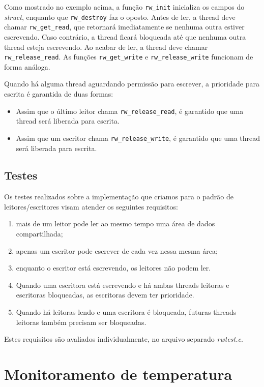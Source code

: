 \documentclass[12pt]{article}
\begin{document}
Como mostrado no exemplo acima,
a função \texttt{rw\_init}
inicializa os campos do \textit{struct},
enquanto que \texttt{rw\_destroy} faz o oposto.
Antes de ler,
a thread deve chamar \texttt{rw\_get\_read},
que retornará imediatamente
se nenhuma outra estiver escrevendo.
Caso contrário, a thread ficará bloqueada
até que nenhuma outra thread esteja escrevendo.
Ao acabar de ler,
a thread deve chamar \texttt{rw\_release\_read}.
As funções \texttt{rw\_get\_write} e \texttt{rw\_release\_write}
funcionam de forma análoga.

Quando há alguma thread aguardando permissão para escrever,
a prioridade para escrita é garantida de duas formas:
\begin{itemize}
	\item Assim que o último leitor chama \texttt{rw\_release\_read},
		é garantido que uma thread será liberada para escrita.
	\item Assim que um escritor chama \texttt{rw\_release\_write},
		é garantido que uma thread será liberada para escrita.
\end{itemize}

\subsection{Testes}

Os testes realizados sobre a implementação que criamos
para o padrão de leitores/escritores visam atender
os seguintes requisitos:
\begin{enumerate}
\item mais de um leitor pode ler ao mesmo tempo
uma área de dados compartilhada;
\item apenas um escritor pode escrever
de cada vez nessa mesma área;
\item enquanto o escritor está escrevendo,
os leitores não podem ler.
\item Quando uma escritora está escrevendo e
há ambas threads leitoras e escritoras bloqueadas,
as escritoras devem ter prioridade.
\item Quando há leitoras lendo e uma escritora
é bloqueada, futuras threads leitoras
também precisam ser bloqueadas.
\end{enumerate}
Estes requisitos são avaliados individualmente,
no arquivo separado \textit{rwtest.c}.

\section{Monitoramento de temperatura}
\end{document}
